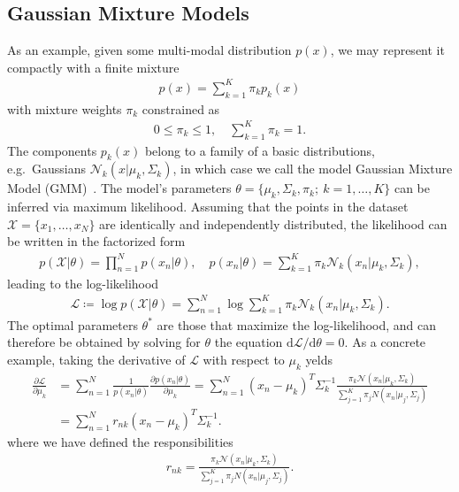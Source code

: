 \subsection{Gaussian Mixture Models}

As an example, given some multi-modal distribution $p(x)$, we may represent it compactly with a finite mixture
%
\begin{align}
p(x) = \sum_{k=1}^{K} \pi_{k} p_{k}(x)
\end{align}
%
with mixture weights $\pi_{k}$ constrained as
%
\begin{align}
0 \leq \pi_k \leq 1, \quad \sum_{k=1}^{K} \pi_{k} = 1.
\end{align}
%
The components $p_{k}(x)$ belong to a family of a basic distributions, e.g.\ Gaussians $\mathcal{N}_k(x | \mu_k, \Sigma_k)$, in which case we call the model Gaussian Mixture Model (GMM)~\cite{Reynolds2009}. The model's parameters $\theta = \{ \mu_k, \Sigma_k, \pi_k; ~ k = 1, \ldots, K \}$ can be inferred via maximum likelihood. Assuming that the points in the dataset $\mathcal{X} = \{x_1, \ldots , x_N \}$ are identically and independently distributed, the likelihood can be written in the factorized form
%
\begin{align}
p(\mathcal{X} | \theta ) = \prod_{n=1}^N p(x_n | \theta), \quad p(x_n | \theta) = \sum_{k=1}^K \pi_k \mathcal{N}_k(x_n | \mu_k, \Sigma_k),
\end{align}
%
leading to the log-likelihood
%
\begin{align}
\mathcal{L} \coloneqq \log p(\mathcal{X} | \theta ) = \sum_{n=1}^N \log \sum_{k=1}^K \pi_k \mathcal{N}_k(x_n | \mu_k, \Sigma_k).
\end{align}
%
The optimal parameters $\theta^{*}$ are those that maximize the log-likelihood, and can therefore be obtained by solving for $\theta$ the equation $\text{d} \mathcal{L} / \text{d}\theta = 0$.
As a concrete example, taking the derivative of $\mathcal{L}$ with respect to $\mu_{k}$ yelds
%
\begin{align}
\frac{\partial \mathcal{L}}{\partial \mu_k} &= \sum_{n=1}^{N} \frac{1}{p(x_n | \theta)} \frac{\partial p(x_n | \theta) }{\partial \mu_k} = \sum_{n=1}^{N} (x_n - \mu_k)^{T} \Sigma_k^{-1} \frac{\pi_k \mathcal{N}(x_n | \mu_k, \Sigma_k)}{\sum_{j=1}^{K} \pi_j N(x_n | \mu_j, \Sigma_j) } \\
&= \sum_{n=1}^{N} r_{nk} (x_n - \mu_k)^{T} \Sigma_k^{-1} .
\end{align}
%
where we have defined the responsibilities
%
\begin{align}
r_{nk} = \frac{\pi_k \mathcal{N}(x_n | \mu_k, \Sigma_k)}{\sum_{j=1}^{K} \pi_j N(x_n | \mu_j, \Sigma_j) }.
\end{align}
